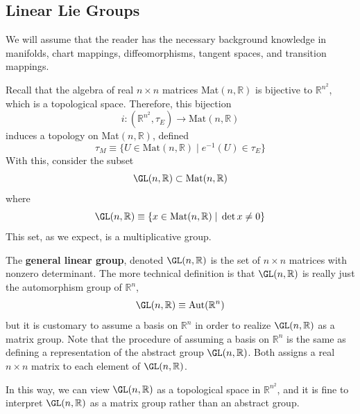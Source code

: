 \subsection{Linear Lie Groups}

  We will assume that the reader has the necessary background knowledge in manifolds, chart mappings, diffeomorphisms, tangent spaces, and transition mappings. 

  Recall that the algebra of real $n \times n$ matrices Mat$(n, \mathbb{R})$ is bijective to $\mathbb{R}^{n^2}$, which is a topological space. Therefore, this bijection 
  \begin{equation}
    i:(\mathbb{R}^{n^2}, \tau_E) \rightarrow \text{Mat}(n, \mathbb{R})
  \end{equation}
  induces a topology on Mat$(n, \mathbb{R})$, defined 
  \begin{equation}
    \tau_M \equiv \{U \in \text{Mat}(n, \mathbb{R}) \; | \; e^{-1} (U) \in \tau_E\}
  \end{equation}
  With this, consider the subset
  \begin{equation}
    \GL(n, \mathbb{R}) \subset \text{Mat}(n, \mathbb{R})
  \end{equation}
  where
  \begin{equation}
    \GL(n, \mathbb{R}) \equiv \{x \in \text{Mat}(n, \mathbb{R}) \;|\; \det{x} \neq 0\}
  \end{equation}
  This set, as we expect, is a multiplicative group. 

  \begin{definition}
    \label{def:general-linear-group-4}
    The \textbf{general linear group}, denoted $\GL(n, \mathbb{R})$ is the set of $n \times n$ matrices with nonzero determinant. The more technical definition is that $\GL(n, \mathbb{R})$ is really just the automorphism group of $\mathbb{R}^n$, 
    \begin{equation}
      \GL(n, \mathbb{R}) \equiv \text{Aut}(\mathbb{R}^n)
    \end{equation}
    but it is customary to assume a basis on $\mathbb{R}^n$ in order to realize $\GL(n, \mathbb{R})$ as a matrix group. Note that the procedure of assuming a basis on $\mathbb{R}^n$ is the same as defining a representation of the abstract group $\GL(n, \mathbb{R})$. Both assigns a real $n \times n$ matrix to each element of $\GL(n, \mathbb{R})$. 
  \end{definition}

  In this way, we can view $\GL(n, \mathbb{R})$ as a topological space in $\mathbb{R}^{n^2}$, and it is fine to interpret $\GL(n, \mathbb{R})$ as a matrix group rather than an abstract group. 


